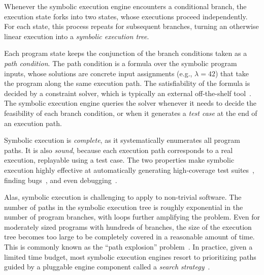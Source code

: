 Whenever the symbolic execution engine encounters a conditional branch, the execution state forks into two states, whose executions proceed independently.  For each state, this process repeats for subsequent branches, turning an otherwise linear execution into a \emph{symbolic execution tree}.

Each program state keeps the conjunction of the branch conditions taken as a \emph{path condition}.
%
The path condition is a formula over the symbolic program inputs, whose solutions are concrete input assignments (e.g., $\lambda = 42$) that take the program along the same execution path.
%
The satisfiability of the formula is decided by a constraint solver, which is typically an external off-the-shelf tool~\cite{stp,Z3,cvc}.
%
The symbolic execution engine queries the solver whenever it needs to decide the feasibility of each branch condition, or when it generates a \emph{test case} at the end of an execution path.

Symbolic execution is \emph{complete}, as it systematically enumerates all program paths.
%
It is also \emph{sound}, because each execution path corresponds to a real execution, replayable using a test case.
%
The two properties make symbolic execution highly effective at automatically generating high-coverage test suites~\cite{klee}, finding bugs~\cite{sage2012,mayhem}, and even debugging~\cite{esd,oasis,portend,king:symbolic:2}.



Alas, symbolic execution is challenging to apply to non-trivial software.  The number of paths in the symbolic execution tree is roughly exponential in the number of program branches, with loops further amplifying the problem.  Even for moderately sized programs with hundreds of branches, the size of the execution tree becomes too large to be completely covered in a reasonable amount of time.
%
This is commonly known as the ``path explosion'' problem~\cite{burnim2008heuristics,klee,godefroid:compdyntest,rwset,state-merging}.
%
In practice, given a limited time budget, most symbolic execution engines resort to prioritizing paths guided by a pluggable engine component called a \emph{search strategy}~\cite{burnim2008heuristics,hct,dart,klee,godefroid:fuzz}.


